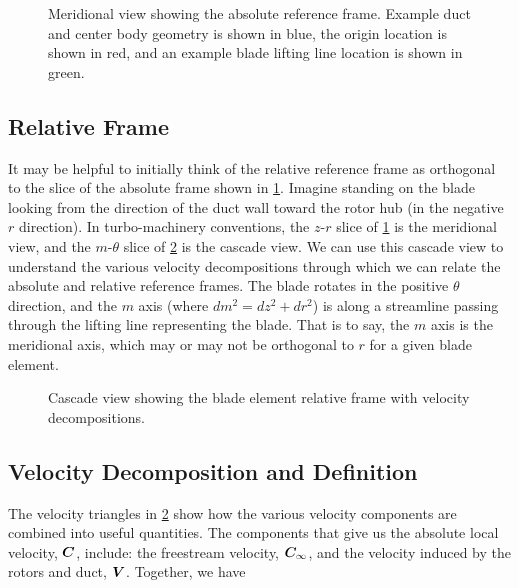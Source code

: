 \begin{figure}[h!]
    \centering
   
   \caption[Absolute reference frame.]{Meridional view showing the absolute reference frame. Example duct and center body geometry is shown in blue, the origin location is shown in red, and an example blade lifting line location is shown in green.}
    \label{fig:absolutecoordinatesystem}
\end{figure}



\subsection{Relative Frame}
\label{ssec:relativeframe}

%
It may be helpful to initially think of the relative reference frame as orthogonal to the slice of the absolute frame shown in \cref{fig:absolutecoordinatesystem}.
%
Imagine standing on the blade looking from the direction of the duct wall toward the rotor hub (in the negative \(r\) direction).
%
In turbo-machinery conventions, the \(z\)-\(r\) slice of \cref{fig:absolutecoordinatesystem} is the meridional view, and the \(m\)-\(\theta\) slice of \cref{fig:relativeframe} is the cascade view.
%
We can use this cascade view to understand the various velocity decompositions through which we can relate the absolute and relative reference frames.
%
The blade rotates in the positive \(\theta\) direction, and the \(m\) axis (where \(dm^2 = dz^2+dr^2\)) is along a streamline passing through the lifting line representing the blade.
%
That is to say, the \(m\) axis is the meridional axis, which may or may not be orthogonal to \(r\) for a given blade element.

\begin{figure}[h!]
    \centering
    
    \caption[Relative Frame.]{Cascade view showing the blade element relative frame with velocity decompositions.}
    \label{fig:relativeframe}
\end{figure}



\subsection{Velocity Decomposition and Definition}

The velocity triangles in \cref{fig:relativeframe} show how the various velocity components are combined into useful quantities.
%
The components that give us the absolute local velocity, \(\bm{C}\), include: the freestream velocity, \(\bm{C}_\infty\),
and the velocity induced by the rotors and duct, \(\bm{V}\).
%
Together, we have

